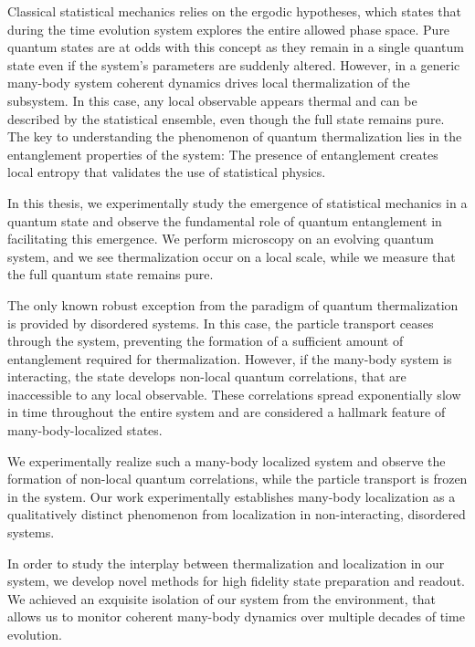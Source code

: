 
Classical statistical mechanics relies on the ergodic hypotheses, which states that during the time evolution system explores the entire allowed phase space. Pure quantum states are at odds with this concept as they remain in a single quantum state even if the system's parameters are suddenly altered. However, in a generic many-body system coherent dynamics drives local thermalization of the subsystem. In this case, any local observable appears thermal and can be described by the statistical ensemble, even though the full state remains pure. The key to understanding the phenomenon of quantum thermalization lies in the entanglement properties of the system: The presence of entanglement creates local entropy that validates the use of statistical physics.

In this thesis, we experimentally study the emergence of statistical mechanics in a quantum state and observe the fundamental role of quantum entanglement in facilitating this emergence. We perform microscopy on an evolving quantum system, and we see thermalization occur on a local scale, while we measure that the full quantum state remains pure.

The only known robust exception from the paradigm of quantum thermalization is provided by disordered systems. In this case, the particle transport ceases through the system, preventing the formation of a sufficient amount of entanglement required for thermalization. However, if the many-body system is interacting, the state develops non-local quantum correlations, that are inaccessible to any local observable. These correlations spread exponentially slow in time throughout the entire system and are considered a hallmark feature of many-body-localized states.

We experimentally realize such a many-body localized system and observe the formation of non-local quantum correlations, while the particle transport is frozen in the system. Our work experimentally establishes many-body localization as a qualitatively distinct phenomenon from localization in non-interacting, disordered systems.

In order to study the interplay between thermalization and localization in our system, we develop novel methods for high fidelity state preparation and readout. We achieved an exquisite isolation of our system from the environment, that allows us to monitor coherent many-body dynamics over multiple decades of time evolution.